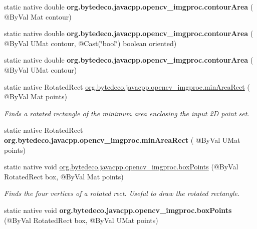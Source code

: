 \begin{DoxyCompactItemize}
\mbox{\label{group__imgproc__shape_ga63665109365ae695072d4ba834f95bbb}} 
static native double {\bfseries org.\+bytedeco.\+javacpp.\+opencv\+\_\+imgproc.\+contour\+Area} ( @By\+Val Mat contour)
\item 
\mbox{\label{group__imgproc__shape_ga8c4e4c69db5ec099b7c3431e05a6ce84}} 
static native double {\bfseries org.\+bytedeco.\+javacpp.\+opencv\+\_\+imgproc.\+contour\+Area} ( @By\+Val U\+Mat contour, @Cast(\char`\"{}bool\char`\"{}) boolean oriented)
\item 
\mbox{\label{group__imgproc__shape_ga0cfde91590f81f0544f40ea3ce2c51bb}} 
static native double {\bfseries org.\+bytedeco.\+javacpp.\+opencv\+\_\+imgproc.\+contour\+Area} ( @By\+Val U\+Mat contour)
\item 
static native Rotated\+Rect \hyperlink{group__imgproc__shape_gae621046d95a8ba9f1e1ce112ab8de61a}{org.\+bytedeco.\+javacpp.\+opencv\+\_\+imgproc.\+min\+Area\+Rect} ( @By\+Val Mat points)
\begin{DoxyCompactList}\small\item\em Finds a rotated rectangle of the minimum area enclosing the input 2D point set. \end{DoxyCompactList}\item 
\mbox{\label{group__imgproc__shape_ga2fcdb1e9ccc31aca2f77dc8812752879}} 
static native Rotated\+Rect {\bfseries org.\+bytedeco.\+javacpp.\+opencv\+\_\+imgproc.\+min\+Area\+Rect} ( @By\+Val U\+Mat points)
\item 
static native void \hyperlink{group__imgproc__shape_ga02ee8d410547c387ed348bbb9c2fc213}{org.\+bytedeco.\+javacpp.\+opencv\+\_\+imgproc.\+box\+Points} (@By\+Val Rotated\+Rect box, @By\+Val Mat points)
\begin{DoxyCompactList}\small\item\em Finds the four vertices of a rotated rect. Useful to draw the rotated rectangle. \end{DoxyCompactList}\item 
\mbox{\label{group__imgproc__shape_ga7e1db9a4fe383c8f67a82ffbba7d95bd}} 
static native void {\bfseries org.\+bytedeco.\+javacpp.\+opencv\+\_\+imgproc.\+box\+Points} (@By\+Val Rotated\+Rect box, @By\+Val U\+Mat points)
\item 

\end{DoxyCompactItemize}
